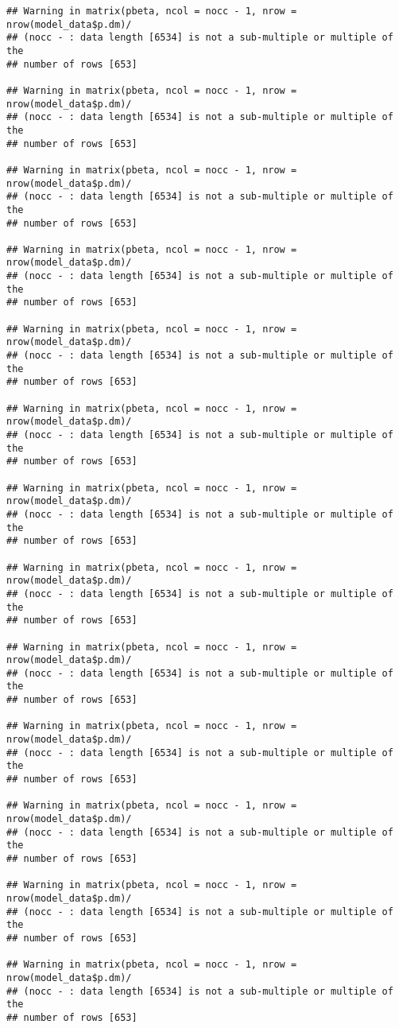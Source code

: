 \documentclass[]{article}
\begin{document}
\begin{verbatim}
## Warning in matrix(pbeta, ncol = nocc - 1, nrow = nrow(model_data$p.dm)/
## (nocc - : data length [6534] is not a sub-multiple or multiple of the
## number of rows [653]

## Warning in matrix(pbeta, ncol = nocc - 1, nrow = nrow(model_data$p.dm)/
## (nocc - : data length [6534] is not a sub-multiple or multiple of the
## number of rows [653]

## Warning in matrix(pbeta, ncol = nocc - 1, nrow = nrow(model_data$p.dm)/
## (nocc - : data length [6534] is not a sub-multiple or multiple of the
## number of rows [653]

## Warning in matrix(pbeta, ncol = nocc - 1, nrow = nrow(model_data$p.dm)/
## (nocc - : data length [6534] is not a sub-multiple or multiple of the
## number of rows [653]

## Warning in matrix(pbeta, ncol = nocc - 1, nrow = nrow(model_data$p.dm)/
## (nocc - : data length [6534] is not a sub-multiple or multiple of the
## number of rows [653]

## Warning in matrix(pbeta, ncol = nocc - 1, nrow = nrow(model_data$p.dm)/
## (nocc - : data length [6534] is not a sub-multiple or multiple of the
## number of rows [653]

## Warning in matrix(pbeta, ncol = nocc - 1, nrow = nrow(model_data$p.dm)/
## (nocc - : data length [6534] is not a sub-multiple or multiple of the
## number of rows [653]

## Warning in matrix(pbeta, ncol = nocc - 1, nrow = nrow(model_data$p.dm)/
## (nocc - : data length [6534] is not a sub-multiple or multiple of the
## number of rows [653]

## Warning in matrix(pbeta, ncol = nocc - 1, nrow = nrow(model_data$p.dm)/
## (nocc - : data length [6534] is not a sub-multiple or multiple of the
## number of rows [653]

## Warning in matrix(pbeta, ncol = nocc - 1, nrow = nrow(model_data$p.dm)/
## (nocc - : data length [6534] is not a sub-multiple or multiple of the
## number of rows [653]

## Warning in matrix(pbeta, ncol = nocc - 1, nrow = nrow(model_data$p.dm)/
## (nocc - : data length [6534] is not a sub-multiple or multiple of the
## number of rows [653]

## Warning in matrix(pbeta, ncol = nocc - 1, nrow = nrow(model_data$p.dm)/
## (nocc - : data length [6534] is not a sub-multiple or multiple of the
## number of rows [653]

## Warning in matrix(pbeta, ncol = nocc - 1, nrow = nrow(model_data$p.dm)/
## (nocc - : data length [6534] is not a sub-multiple or multiple of the
## number of rows [653]


\end{verbatim}
\end{document}

